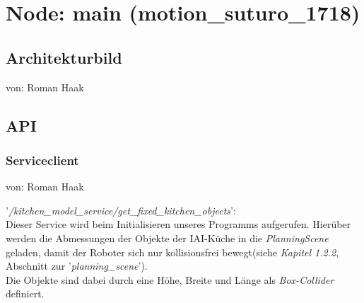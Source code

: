 \documentclass{suturo}
\begin{document}

\makeatletter
\newcommand{\chapterauthor}[1]{%
  {\parindent0pt\vspace*{-27pt}%
  \linespread{0}\small\begin{flushright}von: #1\end{flushright}%
  \par\nobreak\vspace*{0pt}}
  \@afterheading%
}
\makeatother

\section{Node: main (motion\_suturo\_1718)}
\subsection{Architekturbild}
\chapterauthor{Roman Haak}
\begin{figure}[!htb]
\end{figure}

\subsection{API}
\subsubsection{Serviceclient}
\chapterauthor{Roman Haak}
'\textit{/kitchen\_model\_service/get\_fixed\_kitchen\_objects}': \\
Dieser Service wird beim Initialisieren unseres Programms aufgerufen. Hierüber werden die Abmessungen der Objekte der IAI-Küche in die \textit{PlanningScene} geladen, damit der Roboter sich nur kollisionsfrei bewegt(siehe \textit{Kapitel 1.2.2}, Abschnitt zur '\textit{planning\_scene}').\\
Die Objekte sind dabei durch eine Höhe, Breite und Länge als \textit{Box-Collider} definiert.
\end{document}
